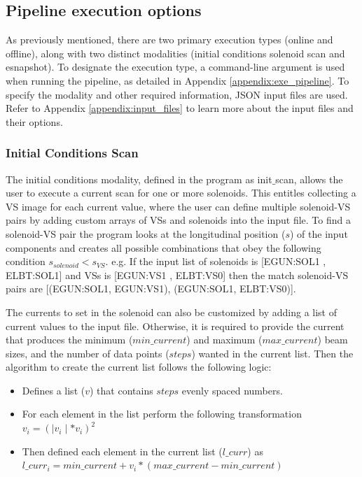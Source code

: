 \documentclass{article}
\begin{document}
\subsection{Pipeline execution options}

As previously mentioned, there are two primary execution types (online and offline), along with two distinct modalities (initial conditions solenoid scan and esnapshot). To designate the execution type, a command-line argument is used when running the pipeline, as detailed in Appendix \ref{appendix:exe_pipeline}. To specify the modality and other required information, JSON input files are used. Refer to Appendix \ref{appendix:input_files} to learn more about the input files and their options.
    
\subsubsection{Initial Conditions Scan}

The initial conditions modality, defined in the program as init$\_$scan, allows the user to execute a current scan for one or more solenoids. This entitles collecting a VS image for each current value, where the user can define multiple solenoid-VS pairs by adding custom arrays of VSs and solenoids into the input file. To find a solenoid-VS pair the program looks at the longitudinal position ($s$) of the input components and creates all possible combinations that obey the following condition $s_{solenoid}< s_{VS}$. e.g. If the input list of solenoids is [EGUN:SOL1 , ELBT:SOL1] and VSs is [EGUN:VS1 , ELBT:VS0] then the match solenoid-VS pairs are [(EGUN:SOL1, EGUN:VS1), (EGUN:SOL1, ELBT:VS0)].

The currents to set in the solenoid can also be customized by adding a list of current values to the input file. Otherwise, it is required to provide the current that produces the minimum ($min\_current$) and maximum ($max\_current$) beam sizes, and the number of data points ($steps$) wanted in the current list. Then the algorithm to create the current list follows the following logic:
\begin{itemize}
    \item Defines a list ($v$) that contains $steps$ evenly spaced numbers.
    \item For each element in the list perform the following transformation $v_i = (\mid v_i \mid * v_i)^{2}$
    \item Then defined each element in the current list ($l\_curr$) as $l\_curr_{i} = min\_current + v_i * (max\_current - min\_current)$
\end{itemize} 
\end{document}
